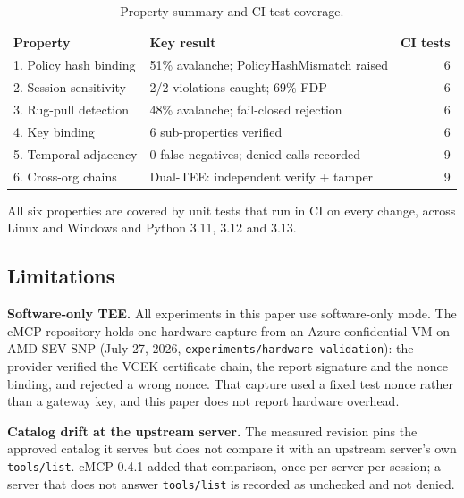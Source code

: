 \begin{table}[h]
\centering
\caption{Property summary and CI test coverage.}
\label{tab:ci-coverage}
\begin{tabular}{lp{4.2cm}r}
\toprule
Property & Key result & CI tests \\
\midrule
1. Policy hash binding   & 51\% avalanche; PolicyHashMismatch raised & 6 \\
2. Session sensitivity   & 2/2 violations caught; 69\% FDP          & 6 \\
3. Rug-pull detection    & 48\% avalanche; fail-closed rejection     & 6 \\
4. Key binding           & 6 sub-properties verified                 & 6 \\
5. Temporal adjacency    & 0 false negatives; denied calls recorded  & 9 \\
6. Cross-org chains      & Dual-TEE: independent verify + tamper    & 9 \\
\bottomrule
\end{tabular}
\end{table}

All six properties are covered by unit tests that run in CI on every change,
across Linux and Windows and Python 3.11, 3.12 and 3.13.

\subsection{Limitations}

\textbf{Software-only TEE.} All experiments in this paper use software-only mode. The
cMCP repository holds one hardware capture from an Azure confidential VM on AMD SEV-SNP
(July 27, 2026, \texttt{experiments/hardware-validation}): the provider verified the
VCEK certificate chain, the report signature and the nonce binding, and rejected a wrong
nonce. That capture used a fixed test nonce rather than a gateway key, and this paper does
not report hardware overhead.

\textbf{Catalog drift at the upstream server.} The measured revision pins the approved
catalog it serves but does not compare it with an upstream server's own
\texttt{tools/list}. cMCP 0.4.1 added that comparison, once per server per session; a
server that does not answer \texttt{tools/list} is recorded as unchecked and not denied.

